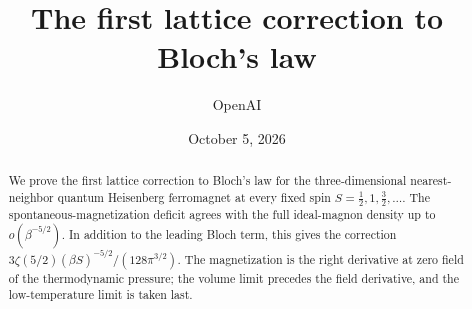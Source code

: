 \documentclass[11pt]{article}
\title{The first lattice correction to Bloch's law}
\author{OpenAI}
\date{October 5, 2026}
\numberwithin{equation}{section}
\theoremstyle{definition}
\theoremstyle{remark}
\begin{document}
\maketitle
\begin{abstract}
We prove the first lattice correction to Bloch's law for the
three-dimensional nearest-neighbor quantum Heisenberg ferromagnet at every
fixed spin $S=\tfrac12,1,\tfrac32,\ldots$. The spontaneous-magnetization
deficit agrees with the full ideal-magnon density up to
$o(\beta^{-5/2})$. In addition to the leading Bloch term, this gives the
correction $3\zeta(5/2)(\beta S)^{-5/2}/(128\pi^{3/2})$.
The magnetization is the right derivative at zero field of the
thermodynamic pressure; the volume limit precedes the field derivative,
and the low-temperature limit is taken last.
\end{abstract}
\tableofcontents










\end{document}
